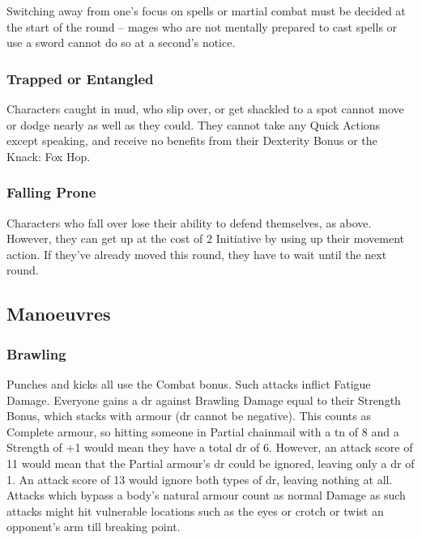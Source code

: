 \documentclass[titlepage,a4paper,openany]{book}
\begin{document}
\begin{multicols}{2}
Switching away from one's focus on spells or martial combat must be decided at the start of the \gls{round} -- mages who are not mentally prepared to cast spells or use a sword cannot do so at a second's notice.

\subsubsection{Trapped or Entangled}

Characters caught in mud, who slip over, or get shackled to a spot cannot move or dodge nearly as well as they could.
They cannot take any Quick Actions except speaking, and receive no benefits from their Dexterity Bonus or the Knack: Fox Hop.

\subsubsection{Falling Prone}\label{prone}

Characters who fall over lose their ability to defend themselves, as above.  However, they can get up at the cost of 2 Initiative by using up their movement action.  If they've already moved this \gls{round}, they have to wait until the next \gls{round}.

\subsection{Manoeuvres}

\subsubsection{Brawling}

Punches and kicks all use the Combat bonus. Such attacks inflict Fatigue Damage. Everyone gains a \gls{dr} against Brawling Damage equal to their Strength Bonus, which stacks with armour (\gls{dr} cannot be negative). This counts as Complete armour, so hitting someone in Partial chainmail with a \gls{tn} of 8 and a Strength of +1 would mean they have a total \gls{dr} of 6. However, an attack score of 11 would mean that the Partial armour's \gls{dr} could be ignored, leaving only a \gls{dr} of 1. An attack score of 13 would ignore both types of \gls{dr}, leaving nothing at all. Attacks which bypass a body's natural armour count as normal Damage as such attacks might hit vulnerable locations such as the eyes or crotch or twist an opponent's arm till breaking point.


\end{multicols}
\end{document}
